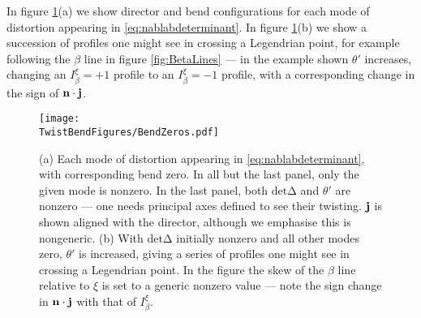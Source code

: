 { In figure \ref{fig:BendZeros}(a) we show director and bend configurations for each mode of distortion appearing in \eqref{eq:nablabdeterminant}. In figure \ref{fig:BendZeros}(b) we show a succession of profiles one might see in crossing a Legendrian point, for example following the $\beta$ line in figure \ref{fig:BetaLines} --- in the example shown $\theta'$ increases, changing an $I_\beta^\xi=+1$ profile to an $I_\beta^\xi=-1$ profile, with a corresponding change in the sign of $\mathbf{n} \cdot \mathbf{j}$. 
\begin{figure}[htbp]
    \centering
    \texttt{[image: \\TwistBendFigures/BendZeros.pdf]}
    \caption[The local structure of $\beta$ lines.]{(a) Each mode of distortion appearing in \eqref{eq:nablabdeterminant}, with corresponding bend zero. In all but the last panel, only the given mode is nonzero. In the last panel, both $\mathrm{det \Delta}$ and $\theta'$ are nonzero --- one needs principal axes defined to see their twisting. $\mathbf{j}$ is shown aligned with the director, although we emphasise this is nongeneric. (b) With $\mathrm{det\Delta}$ initially nonzero and all other modes zero, $\theta'$ is increased, giving a series of profiles one might see in crossing a Legendrian point. In the figure the skew of the $\beta$ line relative to $\xi$ is set to a generic nonzero value --- note the sign change in $\mathbf{n} \cdot \mathbf{j}$ with that of $I_\beta^\xi$.}
    \label{fig:BendZeros}
\end{figure}
}
